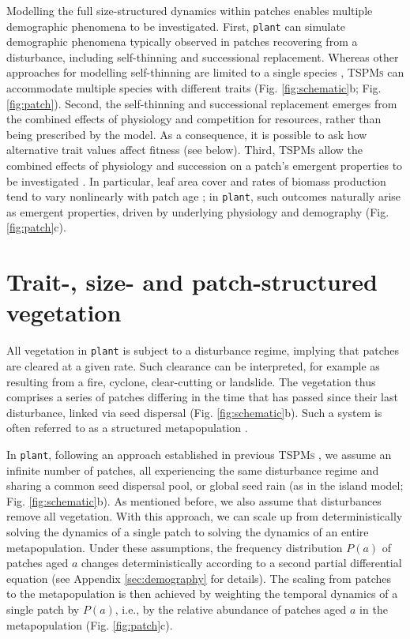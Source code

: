 \documentclass[a4paper,11pt]{article}
\newcommand{\plant}{\texttt{plant}}
\begin{document}
Modelling the full size-structured dynamics within patches enables multiple demographic phenomena to be
investigated. First, {\plant} can simulate demographic
phenomena typically observed in patches
recovering from a disturbance, including self-thinning and
successional replacement. Whereas other approaches for modelling
self-thinning are limited to a single species
\citep[e.g.,][]{Barnes-2004, Coomes-2007}, \textsc{TSPMs} can accommodate
multiple species with different traits (Fig. \ref{fig:schematic}b;
Fig. \ref{fig:patch}). Second, the self-thinning and
successional replacement emerges from the
combined effects of physiology and competition for resources, rather
than being prescribed by the model. As a consequence, it is possible to ask how alternative trait values affect fitness (see below). Third, \textsc{TSPMs} allow the combined effects of physiology and succession on a patch's emergent
properties to be investigated
\citep{Moorcroft-2001, Falster-2011}. In particular, leaf area cover and rates of biomass
production tend to vary nonlinearly with patch
age \citep{Smith-2001, Binkley-2002, Ogawa-2010};
in {\plant}, such outcomes naturally arise as emergent properties,
driven by underlying physiology and demography (Fig. \ref{fig:patch}c).

\section{Trait-, size- and patch-structured vegetation}

All vegetation in {\plant} is subject to a disturbance regime, implying that patches
are cleared at a given rate. Such clearance can be interpreted, for example
as resulting from a fire, cyclone, clear-cutting or
landslide. The vegetation thus comprises a series of patches
differing in the time that has passed since their last disturbance, linked via seed dispersal
(Fig. \ref{fig:schematic}b). Such a system is often referred to as a
structured metapopulation \citep{Gyllenberg-2001}.

In {\plant}, following an approach established in previous \textsc{TSPMs}
\citep{Kohyama-1993, Moorcroft-2001, Falster-2011},
we assume an infinite number of patches, all experiencing
the same disturbance regime and sharing a common seed dispersal pool, or global seed rain
(as in the island model; Fig. \ref{fig:schematic}b). As mentioned before, we also assume
that disturbances remove all vegetation. With this
approach, we can scale up from deterministically solving the dynamics of
a single patch to solving the dynamics of an entire metapopulation.
Under these assumptions, the frequency distribution \(P(a)\) of patches aged
\(a\) changes deterministically according to a second partial differential equation (see Appendix
\ref{sec:demography} for details). The scaling from patches to the
metapopulation is then achieved by weighting the temporal dynamics of
a single patch by \(P(a)\), i.e., by the relative abundance of patches aged
\(a\) in the metapopulation (Fig. \ref{fig:patch}c).
\end{document}
